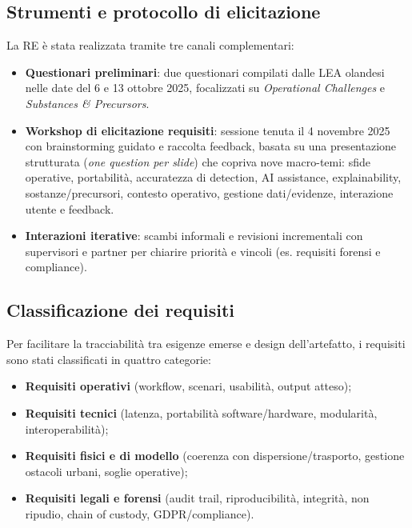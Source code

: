 \subsection{Strumenti e protocollo di elicitazione}
\label{subsec:re_tools}

La RE è stata realizzata tramite tre canali complementari:

\begin{itemize}
    \item \textbf{Questionari preliminari}: due questionari compilati dalle LEA olandesi nelle date del 6 e 13 ottobre 2025, focalizzati su \emph{Operational Challenges} e \emph{Substances \& Precursors}.
    \item \textbf{Workshop di elicitazione requisiti}: sessione tenuta il 4 novembre 2025 con brainstorming guidato e raccolta feedback, basata su una presentazione strutturata (\emph{one question per slide}) che copriva nove macro-temi: sfide operative, portabilità, accuratezza di detection, AI assistance, explainability, sostanze/precursori, contesto operativo, gestione dati/evidenze, interazione utente e feedback.
    \item \textbf{Interazioni iterative}: scambi informali e revisioni incrementali con supervisori e partner per chiarire priorità e vincoli (es. requisiti forensi e compliance).
\end{itemize}

\subsection{Classificazione dei requisiti}
\label{subsec:re_taxonomy}

Per facilitare la tracciabilità tra esigenze emerse e design dell'artefatto, i requisiti sono stati classificati in quattro categorie:

\begin{itemize}
    \item \textbf{Requisiti operativi} (workflow, scenari, usabilità, output atteso);
    \item \textbf{Requisiti tecnici} (latenza, portabilità software/hardware, modularità, interoperabilità);
    \item \textbf{Requisiti fisici e di modello} (coerenza con dispersione/trasporto, gestione ostacoli urbani, soglie operative);
    \item \textbf{Requisiti legali e forensi} (audit trail, riproducibilità, integrità, non ripudio, chain of custody, GDPR/compliance).
\end{itemize}

